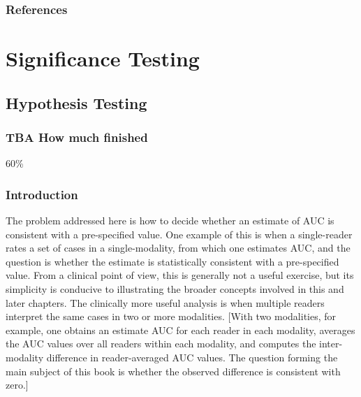 \documentclass[
]{book}
\begin{document}
\hypertarget{sources-of-variability-references}{%
\section{References}\label{sources-of-variability-references}}

\hypertarget{part-significance-testing}{%
\part*{Significance Testing}\label{part-significance-testing}}

\hypertarget{hypothesis-testing}{%
\chapter{Hypothesis Testing}\label{hypothesis-testing}}

\hypertarget{hypothesis-testing-how-much-finished}{%
\section{TBA How much finished}\label{hypothesis-testing-how-much-finished}}

60\%

\hypertarget{hypothesis-testing-introduction}{%
\section{Introduction}\label{hypothesis-testing-introduction}}

The problem addressed here is how to decide whether an estimate of AUC is consistent with a pre-specified value. One example of this is when a single-reader rates a set of cases in a single-modality, from which one estimates AUC, and the question is whether the estimate is statistically consistent with a pre-specified value. From a clinical point of view, this is generally not a useful exercise, but its simplicity is conducive to illustrating the broader concepts involved in this and later chapters. The clinically more useful analysis is when multiple readers interpret the same cases in two or more modalities. {[}With two modalities, for example, one obtains an estimate AUC for each reader in each modality, averages the AUC values over all readers within each modality, and computes the inter-modality difference in reader-averaged AUC values. The question forming the main subject of this book is whether the observed difference is consistent with zero.{]}
\end{document}
